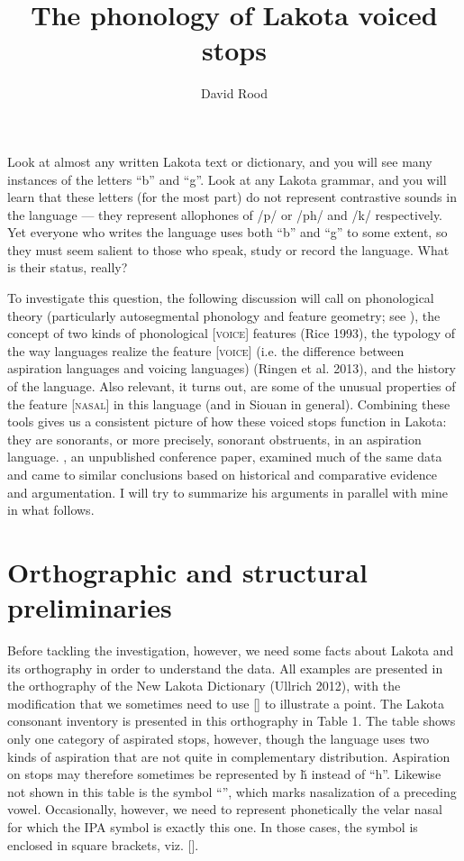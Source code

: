 \documentclass[output=paper]{LSP/langsci}
\author{David Rood}
\title{The phonology of Lakota voiced stops}
\begin{document}
Look at almost any written Lakota text or dictionary, and you will see many instances of the letters ``b'' and ``g''. Look at any Lakota grammar, and you will learn that these letters (for the most part) do not represent contrastive sounds in the language --- they represent allophones of /p/ or /ph/ and /k/ respectively. Yet everyone who writes the language uses both ``b'' and ``g'' to some extent, so they must seem salient to those who speak, study or record the language. What is their status, really?

To investigate this question, the following discussion will call on phonological theory (particularly autosegmental phonology and feature geometry; see \citet{Clements1985}), the concept of two kinds of phonological [\textsc{voice}] features (Rice 1993), the typology of the way languages realize the feature [\textsc{voice}] (i.e. the difference between aspiration languages and voicing languages) (Ringen et al. 2013), and the history of the language. Also relevant, it turns out, are some of the unusual properties of the feature [\textsc{nasal}] in this language (and in Siouan in general). Combining these tools gives us a consistent picture of how these voiced stops function in Lakota: they are sonorants, or more precisely, sonorant obstruents, in an aspiration language. \citet{Rankin2001}, an unpublished conference paper, examined much of the same data and came to similar conclusions based on historical and comparative evidence and argumentation. I will try to summarize his arguments in parallel with mine in what follows.

\section{Orthographic and structural preliminaries}

Before tackling the investigation, however, we need some facts about Lakota and its orthography in order to understand the data. All examples are presented in the orthography of the New Lakota Dictionary (Ullrich 2012), with the modification that we sometimes need to use [] to illustrate a point. The Lakota consonant inventory is presented in this orthography in Table 1. The table shows only one category of aspirated stops, however, though the language uses two kinds of aspiration that are not quite in complementary distribution. Aspiration on stops may therefore sometimes be represented by \v{h} instead of ``h''. Likewise not shown in this table is the symbol ``'', which marks nasalization of a preceding vowel. Occasionally, however, we need to represent phonetically the velar nasal for which the IPA symbol is exactly this one. In those cases, the symbol is enclosed in square brackets, viz. [].
\end{document}
